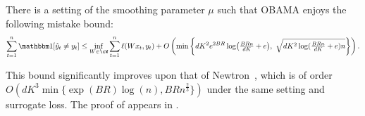 \begin{theorem}
\label{thm:bandit_multiclass}
There is a setting of the smoothing parameter $\mu$ such that OBAMA enjoys the following mistake bound:
\[ 
\sum_{t=1}^{n}\ind\brk*{\yh_t\neq{}y_t}\leq\inf_{W \in \cW} \sum_{t=1}^n \ell(Wx_t, y_t) + O\left(\min\left\{dK^2e^{2BR}\log\prn*{\tfrac{BRn}{dK} + e},\ \sqrt{dK^2\log(\tfrac{BRn}{dK} + e)n}\right\}\right).
\]
\end{theorem}
This bound significantly improves upon that of Newtron~\citep{hazan2011newtron},
which is of order $O(dK^3\min\{\exp(BR)\log(n), BRn^{\frac{2}{3}}\})$ under the same setting and surrogate loss. The proof of  appears in .


